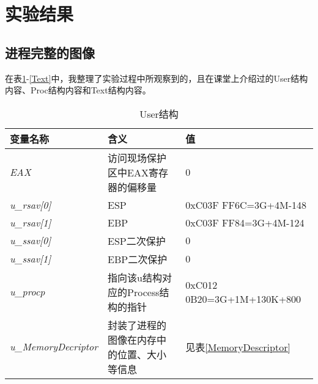\section{实验结果}
\subsection{进程完整的图像}
在表\ref{User}-\ref{Text}中，我整理了实验过程中所观察到的，且在课堂上介绍过的User结构内容、Proc结构内容和Text结构内容。

\begin{table}[htbp]
    \centering
 \begin{tabular}{lll}\toprule
    变量名称      &含义         &值        \\\midrule
   \textit{EAX         }&访问现场保护区中EAX寄存器的偏移量 &0               \\
   \textit{u\_rsav[0]   }&ESP                &0xC03F FF6C=3G+4M-148     \\
   \textit{u\_rsav[1]   }&EBP                &0xC03F FF84=3G+4M-124     \\
   \textit{u\_ssav[0]   }&ESP二次保护            &0     \\
   \textit{u\_ssav[1]   }&EBP二次保护            &0     \\
   \textit{u\_procp     }&指向该u结构对应的Process结构的指针&0xC012 0B20=3G+1M+130K+800\\
   \textit{u\_MemoryDecriptor}&封装了进程的图像在内存中的位置、大小等信息&                  见表\ref{MemoryDescriptor}    \\
   \bottomrule
\end{tabular}
\caption{User结构}\label{User}
\end{table}

